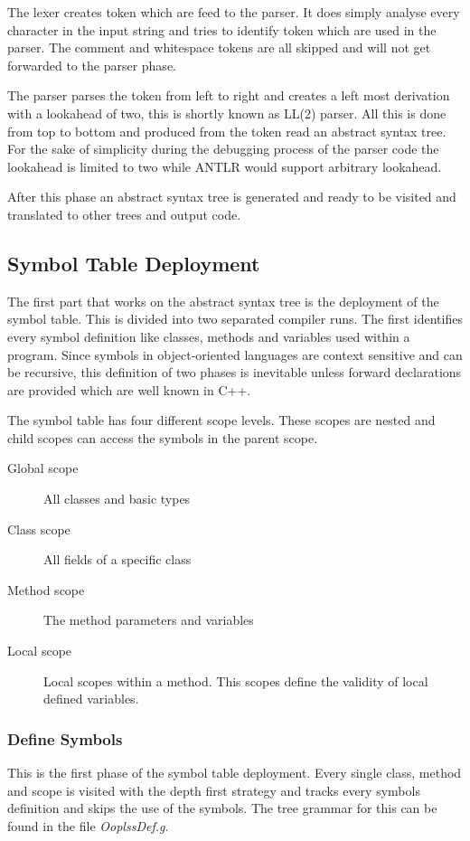The lexer creates token which are feed to the parser. It does simply
analyse every character in the input string and tries to identify token
which are used in the parser. The comment and whitespace tokens are all
skipped and will not get forwarded to the parser phase.

The parser parses the token from left to right and creates a left most
derivation with a lookahead of two, this is shortly known as LL(2) parser.
All this is done from top to bottom and produced from the token read an 
abstract syntax tree. For the sake of simplicity during the debugging
process of the parser code the lookahead is limited to two while ANTLR
would support arbitrary lookahead.

After this phase an abstract syntax tree is generated and ready to be visited
and translated to other trees and output code.

\subsection{Symbol Table Deployment}
The first part that works on the abstract syntax tree is the deployment of
the symbol table. This is divided into two separated compiler runs. The
first identifies every symbol definition like classes, methods and
variables used within a program. Since symbols in object-oriented
languages are context sensitive and can be recursive, this definition
of two phases is inevitable unless forward declarations are provided
which are well known in C++.

The symbol table has four different scope levels. These scopes are nested
and child scopes can access the symbols in the parent scope.
\begin{description}
	\item[Global scope] All classes and basic types
	\item[Class scope] All fields of a specific class
	\item[Method scope] The method parameters and variables
	\item[Local scope] Local scopes within a method. This scopes
	define the validity of local defined variables.
\end{description}

\subsubsection{Define Symbols}
This is the first phase of the symbol table deployment. Every single
class, method and scope is visited with the depth first strategy and
tracks every symbols definition and skips the use of the symbols. The
tree grammar for this can be found in the file \emph{OoplssDef.g}.

